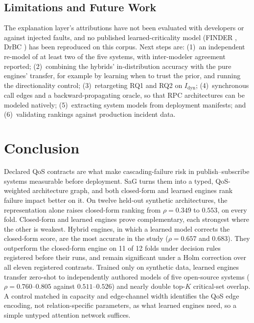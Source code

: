 \documentclass[preprint,3p]{elsarticle}
\begin{document}
\subsection{Limitations and Future Work}
\label{sec:limitations}

The explanation layer's attributions have not been evaluated with developers or against injected faults, and no published learned-criticality model (FINDER \cite{fan2020keyplayers}, DrBC \cite{fan2019learning}) has been reproduced on this corpus. Next steps are: (1)~an independent re-model of at least two of the five systems, with inter-modeler agreement reported; (2)~combining the hybrids' in-distribution accuracy with the pure engines' transfer, for example by learning when to trust the prior, and running the directionality control; (3)~retargeting RQ1 and RQ2 on $I_{\text{dyn}}$; (4)~synchronous call edges and a backward-propagating oracle, so that RPC architectures can be modeled natively; (5)~extracting system models from deployment manifests; and (6)~validating rankings against production incident data.

\section{Conclusion}
\label{sec:9}

Declared QoS contracts are what make cascading-failure risk in publish--subscribe systems measurable before deployment. SaG turns them into a typed, QoS-weighted architecture graph, and both closed-form and learned engines rank failure impact better on it. On twelve held-out synthetic architectures, the representation alone raises closed-form ranking from $\rho = 0.349$ to $0.553$, on every fold. Closed-form and learned engines prove complementary, each strongest where the other is weakest. Hybrid engines, in which a learned model corrects the closed-form score, are the most accurate in the study ($\rho = 0.657$ and $0.683$). They outperform the closed-form engine on 11 of 12 folds under decision rules registered before their runs, and remain significant under a Holm correction over all eleven registered contrasts. Trained only on synthetic data, learned engines transfer zero-shot to independently authored models of five open-source systems ($\rho = 0.760$--$0.805$ against $0.511$--$0.526$) and nearly double top-$K$ critical-set overlap. A control matched in capacity and edge-channel width identifies the QoS edge encoding, not relation-specific parameters, as what learned engines need, so a simple untyped attention network suffices.
\end{document}
